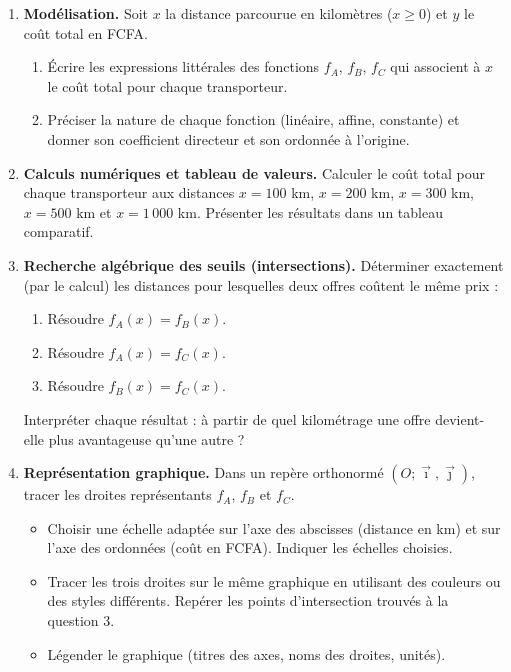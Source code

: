 \documentclass[11pt]{article}
\begin{document}
\begin{enumerate}
    \item \textbf{Modélisation.} Soit $x$ la distance parcourue en kilomètres ($x \ge 0$) et $y$ le coût total en FCFA.
    \begin{enumerate}
        \item Écrire les expressions littérales des fonctions $f_A$, $f_B$, $f_C$ qui associent à $x$ le coût total pour chaque transporteur.
        \item Préciser la nature de chaque fonction (linéaire, affine, constante) et donner son coefficient directeur et son ordonnée à l'origine.
    \end{enumerate}

    \item \textbf{Calculs numériques et tableau de valeurs.}
    Calculer le coût total pour chaque transporteur aux distances $x = 100$ km, $x = 200$ km, $x = 300$ km, $x = 500$ km et $x = 1\,000$ km. Présenter les résultats dans un tableau comparatif.

    \item \textbf{Recherche algébrique des seuils (intersections).}
    Déterminer exactement (par le calcul) les distances pour lesquelles deux offres coûtent le même prix :
    \begin{enumerate}
        \item Résoudre $f_A(x) = f_B(x)$.
        \item Résoudre $f_A(x) = f_C(x)$.
        \item Résoudre $f_B(x) = f_C(x)$.
    \end{enumerate}
    Interpréter chaque résultat : à partir de quel kilométrage une offre devient-elle plus avantageuse qu'une autre ?

    \item \textbf{Représentation graphique.}
    Dans un repère orthonormé $(O; \vec{\imath}, \vec{\jmath})$, tracer les droites représentants $f_A$, $f_B$ et $f_C$.
    \begin{itemize}
        \item Choisir une échelle adaptée sur l'axe des abscisses (distance en km) et sur l'axe des ordonnées (coût en FCFA). Indiquer les échelles choisies.
        \item Tracer les trois droites sur le même graphique en utilisant des couleurs ou des styles différents. Repérer les points d'intersection trouvés à la question 3.
        \item Légender le graphique (titres des axes, noms des droites, unités).
    \end{itemize}


\end{enumerate}
\end{document}
